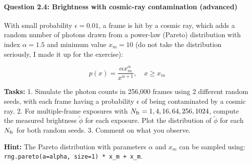 \documentclass[11pt]{article}
\begin{document}
    \paragraph{Question 2.4: Brightness with cosmic-ray contamination
(advanced)}\label{question-2.4-brightness-with-cosmic-ray-contamination-advanced}

With small probability \(\epsilon = 0.01\), a frame is hit by a cosmic
ray, which adds a random number of photons drawn from a power-law
(Pareto) distribution with index \(\alpha = 1.5\) and minimum value
\(x_m = 10\) (do not take the distribution seriously, I made it up for
the exercise):

\[p(x) = \frac{\alpha x_m^\alpha}{x^{\alpha + 1}}, \quad x \geq x_m\]

\textbf{Tasks:} 1. Simulate the photon counts in 256,000 frames using 2
different random seeds, with each frame having a probability
\(\epsilon\) of being contaminated by a cosmic ray. 2. For
multiple-frame exposures with \(N_{\rm fr} = 1, 4, 16, 64, 256, 1024\),
compute the measured brightness \(\tilde{\phi}\) for each exposure. Plot
the distribution of \(\tilde{\phi}\) for each \(N_{\rm fr}\) for both
random seeds. 3. Comment on what you observe.

\textbf{Hint:} The Pareto distribution with parameters \(\alpha\) and
\(x_m\) can be sampled using:
\texttt{rng.pareto(a=alpha,\ size=1)\ *\ x\_m\ +\ x\_m}.
\end{document}
